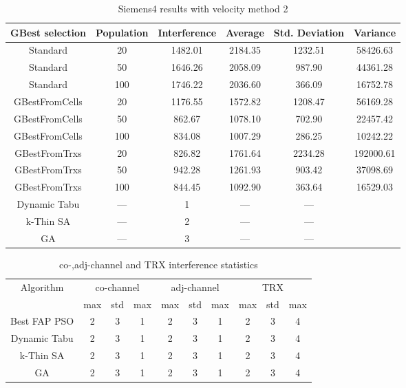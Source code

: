 \begin{table}[H]
\centering
	\begin{tabular}{cccccc}
	\toprule
    GBest selection & Population & Interference & Average & Std. Deviation & Variance \\
    \midrule
    Standard & 20 & 1482.01 & 2184.35 & 1232.51 & 58426.63\\
    Standard & 50 & 1646.26 & 2058.09 & 987.90 & 44361.28\\
    Standard & 100 & 1746.22 & 2036.60 & 366.09 & 16752.78\\
    GBestFromCells & 20 & 1176.55 & 1572.82 & 1208.47 & 56169.28\\
    GBestFromCells & 50 & 862.67 & 1078.10 & 702.90 & 22457.42\\
    GBestFromCells & 100 & 834.08 & 1007.29 & 286.25 & 10242.22\\
    GBestFromTrxs & 20 & 826.82 & 1761.64 & 2234.28 & 192000.61\\
    GBestFromTrxs & 50 & 942.28 & 1261.93 & 903.42 & 37098.69\\
    GBestFromTrxs & 100 & 844.45 & 1092.90 & 363.64 & 16529.03\\
    Dynamic Tabu & --- & 1 & --- & --- \\
    k-Thin SA & --- & 2 & --- & --- \\
    GA & --- & 3 & --- & --- \\
    \bottomrule
	\end{tabular}
\caption{Siemens4 results with velocity method 2}
\label{tab:siem4m2}
\end{table}
\begin{table}[H]
\centering
	\begin{tabular}{cccccccccc}
	\toprule
    Algorithm & \multicolumn{3}{c}{co-channel} & \multicolumn{3}{c}{adj-channel} & \multicolumn{3}{c}{TRX}\\
              & max & std & max
              & max & std & max
              & max & std & max\\
    \midrule
    Best FAP PSO & 2 & 3 & 1 & 2 & 3 & 1 & 2 & 3 & 4\\ \hline
    Dynamic Tabu & 2 & 3 & 1 & 2 & 3 & 1 & 2 & 3 & 4\\\hline
    k-Thin SA & 2 & 3 & 1 & 2 & 3 & 1 & 2 & 3 & 4\\\hline
    GA & 2 & 3 & 1 & 2 & 3 & 1 & 2 & 3 & 4\\\hline
    \bottomrule
	\end{tabular}
\caption{co-,adj-channel and TRX interference statistics}
\label{tab:stats-siem4m1}
\end{table}
